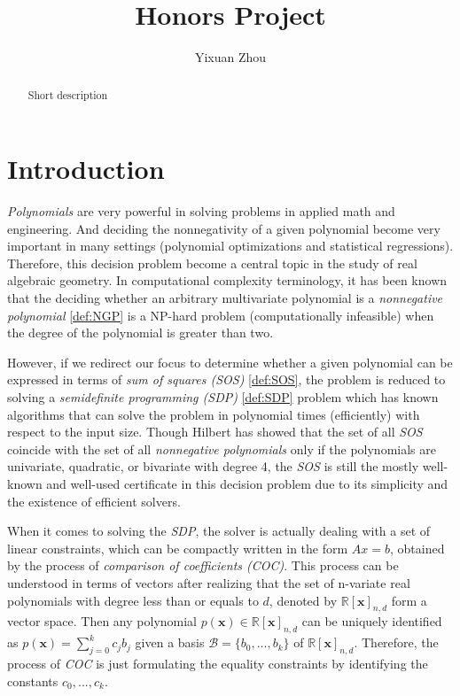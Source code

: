 \documentclass[12pt]{amsart}
\title{Honors Project}
\author{Yixuan Zhou} %
\numberwithin{equation}{section}
\theoremstyle{definition}
\numberwithin{thm}{section}
\begin{document}
 

\begin{abstract}
Short description
\end{abstract}

\maketitle


\section{Introduction} 

\emph{Polynomials} are very powerful in solving problems in applied math and engineering. 
And deciding the nonnegativity of a given polynomial become very important in many settings (polynomial optimizations and statistical regressions). 
Therefore, this decision problem become a central topic in the study of real algebraic geometry. 
In computational complexity terminology, it has been known that the deciding whether an arbitrary multivariate polynomial is a \emph{nonnegative polynomial} \ref{def:NGP} is a NP-hard problem (computationally infeasible) when the 
degree of the polynomial is greater than two. 

However, if we redirect our focus to determine whether a given polynomial can be expressed in terms of \emph{sum of squares (SOS)} \ref{def:SOS},
the problem is reduced to solving a \emph{semidefinite programming (SDP)} \ref{def:SDP} problem which 
has known algorithms that can solve the problem in polynomial times (efficiently) with respect to the input size. 
Though Hilbert has showed that the set of all \emph{SOS} coincide with the set of all \emph{nonnegative polynomials} only if the polynomials are univariate, quadratic, or bivariate with degree 4,
the \emph{SOS} is still the mostly well-known and well-used certificate in this decision problem due to its simplicity and the existence of efficient solvers. \cite{Blekherman:Parrilo:Thomas}

When it comes to solving the \emph{SDP}, the solver is actually dealing with a set of linear constraints, which can be compactly written in the form $Ax = b$, obtained by the process of \emph{comparison of coefficients (COC)}.
This process can be understood in terms of vectors after realizing that the set of n-variate real polynomials with degree less than or equals to $d$, denoted by $\mathbb{R}[\mathbf{x}]_{n, d}$ form a vector space.
Then any polynomial $p(\mathbf{x}) \in \mathbb{R}[\mathbf{x}]_{n, d}$ can be uniquely identified as $p(\mathbf{x}) = \sum_{j = 0}^k c_j b_j$ given a basis $\mathcal{B} = \{b_0, ..., b_k\}$ of $\mathbb{R}[\mathbf{x}]_{n, d}$.
Therefore, the process of \emph{COC} is just formulating the equality constraints by identifying the constants $c_0, ..., c_k$. \cite{Recher:Masterthesis}
\end{document}
